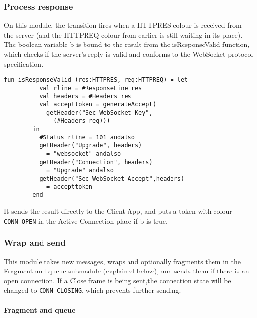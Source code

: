 		
		
	\subsubsection{Process response}
		
		
		On this module, the transition fires when a HTTPRES colour is received from the
		server (and the HTTPREQ colour from earlier is still waiting in its place). The
		boolean variable b is bound to the result from the isResponseValid function,
		which checks if the server's reply is valid and conforms to the WebSocket
		protocol specification.
		
		\begin{lstlisting}[label=lst:isResponseValid,caption=isResponseValid,gobble=2]
		fun isResponseValid (res:HTTPRES, req:HTTPREQ) = let
		  val rline = #ResponseLine res
		  val headers = #Headers res
		  val accepttoken = generateAccept(
		    getHeader("Sec-WebSocket-Key",
		      (#Headers req)))
		in
		  #Status rline = 101 andalso
		  getHeader("Upgrade", headers) 
		    = "websocket" andalso
		  getHeader("Connection", headers) 
		    = "Upgrade" andalso
		  getHeader("Sec-WebSocket-Accept",headers)
		    = accepttoken
		end
		\end{lstlisting}
		
		It sends the result directly to the Client App, and puts a token with colour
		\lstinline:CONN_OPEN: in the Active Connection place if b is true.
		
	\subsubsection{Wrap and send}
		
		
		This module takes new messages, wraps and optionally fragments them in the
		Fragment and queue submodule (explained below), and sends them if there is
		an open connection. If a Close frame is being sent,the
		connection state will be changed to \lstinline:CONN_CLOSING:, which prevents
		further sending.
		
		\paragraph{Fragment and queue}
			
			
